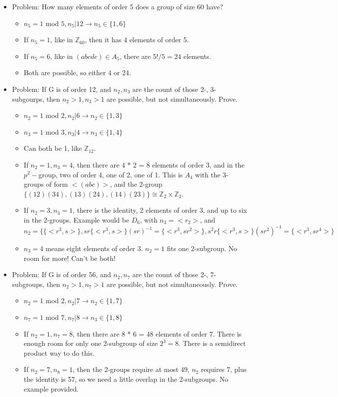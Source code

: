 \documentclass[11pt, oneside]{article}   	%
\begin{document}
\begin{itemize}
\item Problem: How many elements of order 5 does a group of size 60 have?
\begin{itemize}
\item $n_5 = 1 $ mod $ 5, n_5 | 12 \rightarrow n_5 \in \{1, 6\}$
\item If $n_5 = 1$, like in $\mathbb{Z}_{60}$, then it has 4 elements of order 5.
\item If $n_5 = 6$, like in $(abcde) \in A_5$, there are $5! / 5 = 24$ elements.  
\item Both are possible, so either 4 or 24.
\end{itemize}

\item Problem: If G is of order 12, and $n_2, n_3$ are the count of those 2-, 3-subgourps, then $n_2 > 1, n_3 > 1$ are possible, but not simultaneously. Prove.
\begin{itemize}
\item $n_2 = 1 $ mod $ 2, n_2 | 6 \rightarrow n_2 \in \{1, 3\}$
\item $n_3= 1 $ mod $ 3, n_3 | 4 \rightarrow n_3 \in \{1, 4\}$
\item Can both be 1, like $\mathbb{Z}_{12}$.
\item If $n_2 = 1, n_3 = 4$, then there are 4 * 2 = 8 elements of order 3, and in the $p^2-$group, two of order 4, one of 2, one of 1.  This is $A_4$ with the 3-groups of form $<(abc)>$, and the 2-group $\{(12)(34), (13)(24), (14)(23)\} \cong \mathbb{Z}_2 \times \mathbb{Z}_2$.
\item If $n_2 = 3, n_3 = 1$, there is the identity, 2 elements of order 3, and up to six in the 2-groups.  Example would be $D_6$, with $n_3 = <r_2>$, and $n_2 = \{\{<r^3, s>\}, sr\{<r^3, s>\}(sr)^{-1} = \{<r^3, sr^2>\},  s^2r\{<r^3, s>\}(sr^2)^{-1} = \{<r^3, sr^4>\}$
\item $n_3 = 4$ means eight elements of order 3.  $n_2 = 1$ fits one 2-subgroup.  No room for more!  Can't be both!
\end{itemize}


\item Problem: If G is of order 56, and $n_2, n_7$ are the count of those 2-, 7-subgroups, then $n_2 > 1, n_7 > 1$ are possible, but not simultaneously. Prove.
\begin{itemize}
\item $n_2= 1 $ mod $ 2, n_2 | 7 \rightarrow n_2 \in \{1, 7\}$
\item $n_ 7= 1 $ mod $ 7, n_7 | 8 \rightarrow n_3 \in \{1, 8\}$
\item If $n_2 = 1, n_7 = 8$, then there are 8 * 6 = 48 elements of order 7.  There is enough room for only one 2-subgroup of size $2^3 = 8$.   There is a semidirect product way to do this.
\item If $n_2 = 7, n_8 = 1$,  then the 2-groups require at most 49, $n_2$ requires 7, plus the identity is 57, so we need a little overlap in the 2-subgroups.  No example provided.
\end{itemize}



\end{itemize}
\end{document}
